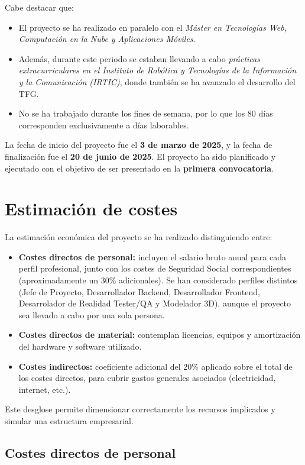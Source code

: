 Cabe destacar que:
\begin{itemize}
    \item El proyecto se ha realizado en paralelo con el \textit{Máster en Tecnologías Web, Computación en la Nube y Aplicaciones Móviles}.
    \item Además, durante este periodo se estaban llevando a cabo \textit{prácticas extracurriculares en el Instituto de Robótica y Tecnologías de la Información y la Comunicación (IRTIC)}, donde también se ha avanzado el desarrollo del TFG.
    \item No se ha trabajado durante los fines de semana, por lo que los 80 días corresponden exclusivamente a días laborables.
\end{itemize}

La fecha de inicio del proyecto fue el \textbf{3 de marzo de 2025}, y la fecha de finalización fue el \textbf{20 de junio de 2025}. El proyecto ha sido planificado y ejecutado con el objetivo de ser presentado en la \textbf{primera convocatoria}.
\section{Estimación de costes}

La estimación económica del proyecto se ha realizado distinguiendo entre:
\begin{itemize}
  \item \textbf{Costes directos de personal:} incluyen el salario bruto anual para cada perfil profesional, junto con los costes de Seguridad Social correspondientes (aproximadamente un 30\% adicionales). Se han considerado perfiles distintos (Jefe de Proyecto, Desarrollador Backend, Desarrollador Frontend, Desarrolador de Realidad Tester/QA y Modelador 3D), aunque el proyecto sea llevado a cabo por una sola persona.
  \item \textbf{Costes directos de material:} contemplan licencias, equipos y amortización del hardware y software utilizado.
  \item \textbf{Costes indirectos:} coeficiente adicional del 20\% aplicado sobre el total de los costes directos, para cubrir gastos generales asociados (electricidad, internet, etc.).
\end{itemize}


Este desglose permite dimensionar correctamente los recursos implicados y simular una estructura empresarial.

\subsection{Costes directos de personal}

